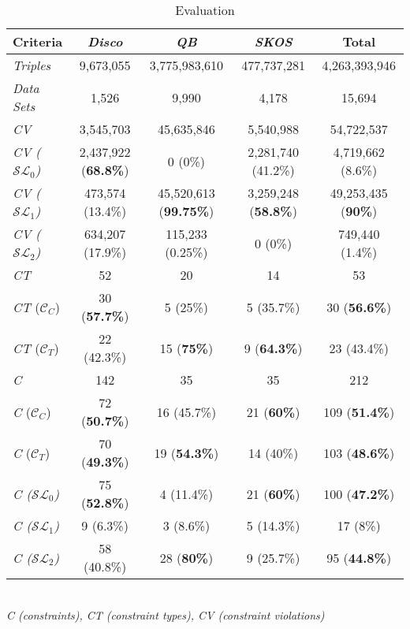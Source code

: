 \documentclass{llncs}
\begin{document}
{\begin{table}[H]
		\scriptsize
    \begin{center}
    \begin{tabular}{@{}lcccc@{}}
    \\       \textbf{Criteria}
           & \textbf{\emph{Disco}}
           & \textbf{\emph{QB}}
					 & \textbf{\emph{SKOS}}
					 & \textbf{Total}
    \\ \midrule
		\emph{Triples} & 9,673,055 & 3,775,983,610 & 477,737,281 & 4,263,393,946 \\
		\emph{Data Sets} & 1,526 & 9,990 & 4,178 & 15,694 \\
		\hline
    \emph{CV} & 3,545,703 & 45,635,846 & 5,540,988 & 54,722,537\\
		\emph{CV ($\mathcal{SL}_{0}$)} & 2,437,922 (\textbf{68.8\%}) & 0 (0\%) & 2,281,740 (41.2\%) & 4,719,662 (8.6\%) \\
		\emph{CV ($\mathcal{SL}_{1}$)} & 473,574 (13.4\%) & 45,520,613 (\textbf{99.75\%}) & 3,259,248 (\textbf{58.8\%}) & 49,253,435 (\textbf{90\%}) \\
    \emph{CV ($\mathcal{SL}_{2}$)} & 634,207 (17.9\%) & 115,233 (0.25\%) & 0 (0\%) & 749,440 (1.4\%) \\
		\hline
		\emph{CT} & 52 & 20 & 14 & 53 \\
		\emph{CT} ($\mathcal{C}_{C}$) & 30 (\textbf{57.7\%}) & 5 (25\%) & 5 (35.7\%) & 30 (\textbf{56.6\%}) \\
		\emph{CT} ($\mathcal{C}_{T}$) & 22 (42.3\%) & 15 (\textbf{75\%}) & 9 (\textbf{64.3\%}) & 23 (43.4\%) \\
		\hline
		\emph{C} & 142 & 35 & 35 & 212 \\
		\hline
		\emph{C} ($\mathcal{C}_{C}$) & 72 (\textbf{50.7\%}) & 16 (45.7\%) & 21 (\textbf{60\%}) & 109 (\textbf{51.4\%}) \\
		\emph{C} ($\mathcal{C}_{T}$) & 70 (\textbf{49.3\%}) & 19 (\textbf{54.3\%}) & 14 (40\%) & 103 (\textbf{48.6\%}) \\
		\hline
		\emph{C ($\mathcal{SL}_{0}$)} & 75 (\textbf{52.8\%})& 4 (11.4\%) & 21 (\textbf{60\%}) & 100 (\textbf{47.2\%}) \\
		\emph{C ($\mathcal{SL}_{1}$)} & 9 (6.3\%)& 3 (8.6\%) & 5 (14.3\%) & 17 (8\%) \\
		\emph{C ($\mathcal{SL}_{2}$)} & 58 (40.8\%) & 28 (\textbf{80\%}) & 9 (25.7\%) & 95 (\textbf{44.8\%}) \\
    \bottomrule
    \end{tabular}
    \\ \emph{C (constraints), CT (constraint types), CV (constraint violations)}
    \caption{Evaluation}
		\label{tab:evaluation}
    \end{center}
\end{table}

}
\end{document}

